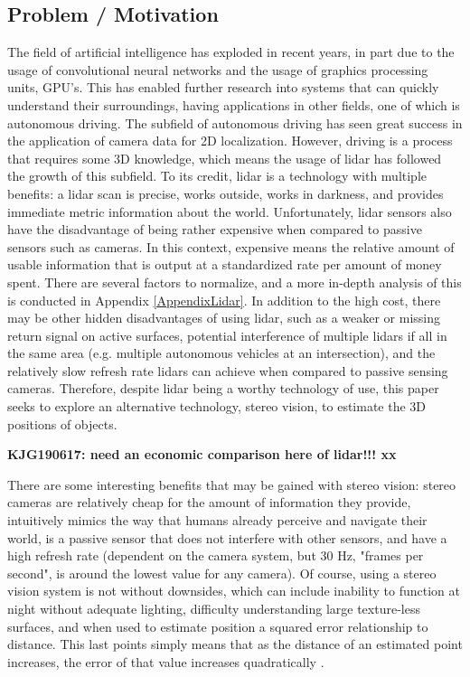 \subsection{Problem / Motivation}
The field of artificial intelligence has exploded in recent years, in part due to the usage of convolutional neural networks and the usage of graphics processing units, GPU's. This has enabled further research into systems that can quickly understand their surroundings, having applications in other fields, one of which is autonomous driving. The subfield of autonomous driving has seen great success in the application of camera data for 2D localization. However, driving is a process that requires some 3D knowledge, which means the usage of lidar has followed the growth of this subfield. To its credit, lidar is a technology with multiple benefits: a lidar scan is precise, works outside, works in darkness, and provides immediate metric information about the world. Unfortunately, lidar sensors also have the disadvantage of being rather expensive when compared to passive sensors such as cameras. In this context, expensive means the relative amount of usable information that is output at a standardized rate per amount of money spent. There are several factors to normalize, and a more in-depth analysis of this is conducted in Appendix \ref{AppendixLidar}. In addition to the high cost, there may be other hidden disadvantages of using lidar, such as a weaker or missing return signal on active surfaces, potential interference of multiple lidars if all in the same area (e.g. multiple autonomous vehicles at an intersection), and the relatively slow refresh rate lidars can achieve when compared to passive sensing cameras. Therefore, despite lidar being a worthy technology of use, this paper seeks to explore an alternative technology, stereo vision, to estimate the 3D positions of objects.

\textbf{KJG190617: need an economic comparison here of lidar!!! xx}

There are some interesting benefits that may be gained with stereo vision: stereo cameras are relatively cheap for the amount of information they provide, intuitively mimics the way that humans already perceive and navigate their world, is a passive sensor that does not interfere with other sensors, and have a high refresh rate (dependent on the camera system, but 30 Hz, "frames per second", is around the lowest value for any camera). Of course, using a stereo vision system is not without downsides, which can include inability to function at night without adequate lighting, difficulty understanding large texture-less surfaces, and when used to estimate position a squared error relationship to distance. This last points simply means that as the distance of an estimated point increases, the error of that value increases quadratically \cite{wang_pseudo-lidar_2019}.

